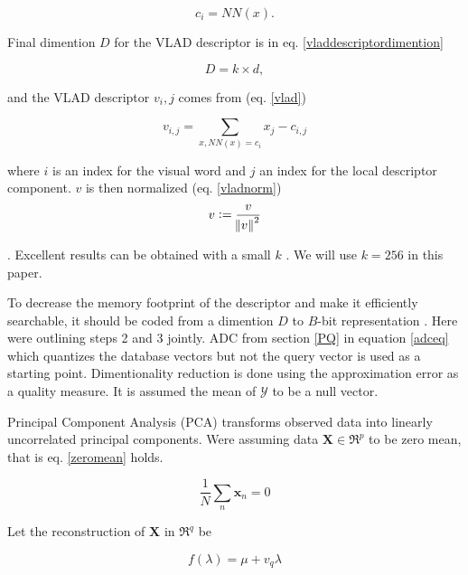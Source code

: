 \documentclass[english,12pt,a4paper,pdftex,elec,utf8]{aaltothesis}
\begin{document}
\begin{equation}
  \label{vladdescriptortovw}
c_i = NN(x).
\end{equation}

Final dimention $D$ for the VLAD descriptor is in eq. \ref{vladdescriptordimention}

\begin{equation}
  \label{vladdescriptordimention}
  D = k \times d,
\end{equation}

and the VLAD descriptor $v_i,j$ comes from (eq. \ref{vlad})

\begin{equation}
  \label{vlad}
  v_{i,j} = \sum_{x, NN(x)=c_i} x_j - c_{i,j}
\end{equation}

where $i$ is an index for the visual word and $j$ an index for the local descriptor component. $v$ is then normalized (eq. \ref{vladnorm})
\begin{equation}
  \label{vladnorm}
  v := \frac{v}{\norm{v}^2}
  \end{equation}

.\cite{Jegou2014} Excellent results can be obtained with a small $k$ \cite{Jegou2014}. We will use $k=256$ in this paper.

To decrease the memory footprint of the descriptor and make it efficiently searchable, it should be coded from a dimention $D$ to $B$-bit representation \cite{Jegou2014}. Here were outlining steps 2 and 3 jointly. ADC from section \ref{PQ} in equation \ref{adceq} which quantizes the database vectors but not the query vector is used as a starting point. Dimentionality reduction is done using the approximation error as a quality measure. It is assumed the mean of $\mathcal{Y}$ to be a null vector.\cite{Jegou2014}

Principal Component Analysis (PCA) transforms observed data into linearly uncorrelated principal components. Were assuming data $\boldsymbol{X} \in \Re^{p}$ to be zero mean, that is eq. \ref{zeromean} holds.

\begin{equation}\label{zeromean}
\frac{1}{N}\sum_n \boldsymbol{x}_n = 0
\end{equation}

Let the reconstruction of $\boldsymbol{X}$ in $\Re^{q}$ be

\begin{equation} \label{pca}
f(\lambda) = \mu + v_q\lambda
\end{equation}
\end{document}
